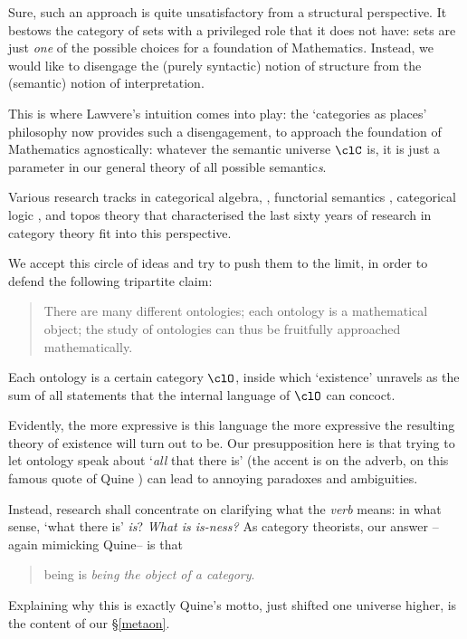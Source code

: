 Sure, such an approach is quite unsatisfactory from a structural perspective. It bestows the category of sets with a privileged role that it does not have: sets are just \emph{one} of the possible choices for a foundation of Mathematics. Instead, we would like to disengage the (purely syntactic) notion of structure from the (semantic) notion of interpretation.

This is where Lawvere's intuition comes into play: the `categories as places' philosophy now provides such a disengagement, to approach the foundation of Mathematics agnostically: whatever the semantic universe $\clC$ is, it is just a parameter in our general theory of all possible semantic\emph{s}.

Various research tracks in categorical algebra, \cite{Janelidze2004}, functorial semantics \cite{lawvere1963functorial,hyland2007category}, categorical logic \cite{lambek1988introduction}, and topos theory \cite{JohnstonePT} that characterised the last sixty years of research in category theory fit into this perspective.

We accept this circle of ideas and try to push them to the limit, in order to defend the following tripartite claim: 
\begin{quote}
  There are many different ontologies; each ontology is a mathematical object; the study of ontologies can thus be fruitfully approached mathematically.
\end{quote}
Each ontology is a certain category $\clO$, inside which `existence' unravels as the sum of all statements that the internal language of $\clO$ can concoct.

Evidently, the more expressive is this language the more expressive the resulting theory of existence will turn out to be. Our presupposition here is that trying to let ontology speak about `\emph{all} that there is' (the accent is on the adverb, on this famous quote of Quine \cite{quine1948there}) can lead to annoying paradoxes and ambiguities. 

Instead, research shall concentrate on clarifying what the \emph{verb} means: in what sense, `what there is' \emph{is}? \emph{What is is-ness?} As category theorists, our answer --again mimicking Quine-- is that
\begin{quote}
	being is \emph{being the object of a category}.
\end{quote}
Explaining why this is exactly Quine's motto, just shifted one universe higher, is the content of our §\ref{metaon}.
